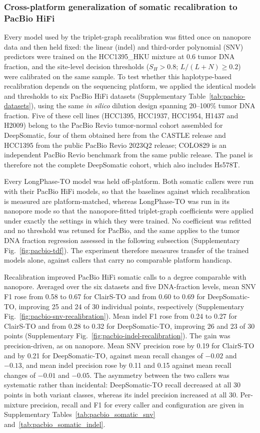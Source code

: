 \documentclass[pdflatex,sn-nature]{sn-jnl}
\begin{document}
\subsubsection*{Cross-platform generalization of somatic recalibration to PacBio HiFi}\label{supp:pacbio-recalibration}

Every model used by the triplet-graph recalibration was fitted once on nanopore data and then held fixed: the linear (indel) and third-order polynomial (SNV) predictors were trained on the HCC1395\_HKU mixture at 0.6 tumor DNA fraction, and the site-level decision thresholds ($S_H>0.8$; $L/(L+N)\ge0.2$) were calibrated on the same sample. To test whether this haplotype-based recalibration depends on the sequencing platform, we applied the identical models and thresholds to six PacBio HiFi datasets (Supplementary Table~\ref{tab:pacbio-datasets}), using the same \emph{in silico} dilution design spanning 20--100\% tumor DNA fraction. Five of these cell lines (HCC1395, HCC1937, HCC1954, H1437 and H2009) belong to the PacBio Revio tumor-normal cohort assembled for DeepSomatic, four of them obtained here from the CASTLE release and HCC1395 from the public PacBio Revio 2023Q2 release; COLO829 is an independent PacBio Revio benchmark from the same public release. The panel is therefore not the complete DeepSomatic cohort, which also includes Hs578T.

Every LongPhase-TO model was held off-platform. Both somatic callers were run with their PacBio HiFi models, so that the baselines against which recalibration is measured are platform-matched, whereas LongPhase-TO was run in its nanopore mode so that the nanopore-fitted triplet-graph coefficients were applied under exactly the settings in which they were trained. No coefficient was refitted and no threshold was retuned for PacBio, and the same applies to the tumor DNA fraction regression assessed in the following subsection (Supplementary Fig.~\ref{fig:pacbio-tdf}). The experiment therefore measures transfer of the trained models alone, against callers that carry no comparable platform handicap.

Recalibration improved PacBio HiFi somatic calls to a degree comparable with nanopore. Averaged over the six datasets and five DNA-fraction levels, mean SNV F1 rose from 0.58 to 0.67 for ClairS-TO and from 0.60 to 0.69 for DeepSomatic-TO, improving 25 and 24 of 30 individual points, respectively (Supplementary Fig.~\ref{fig:pacbio-snv-recalibration}). Mean indel F1 rose from 0.24 to 0.27 for ClairS-TO and from 0.28 to 0.32 for DeepSomatic-TO, improving 26 and 23 of 30 points (Supplementary Fig.~\ref{fig:pacbio-indel-recalibration}). The gain was precision-driven, as on nanopore. Mean SNV precision rose by 0.19 for ClairS-TO and by 0.21 for DeepSomatic-TO, against mean recall changes of $-0.02$ and $-0.13$, and mean indel precision rose by 0.11 and 0.15 against mean recall changes of $-0.01$ and $-0.05$. The asymmetry between the two callers was systematic rather than incidental: DeepSomatic-TO recall decreased at all 30 points in both variant classes, whereas its indel precision increased at all 30. Per-mixture precision, recall and F1 for every caller and configuration are given in Supplementary Tables~\ref{tab:pacbio_somatic_snv} and~\ref{tab:pacbio_somatic_indel}.
\end{document}
